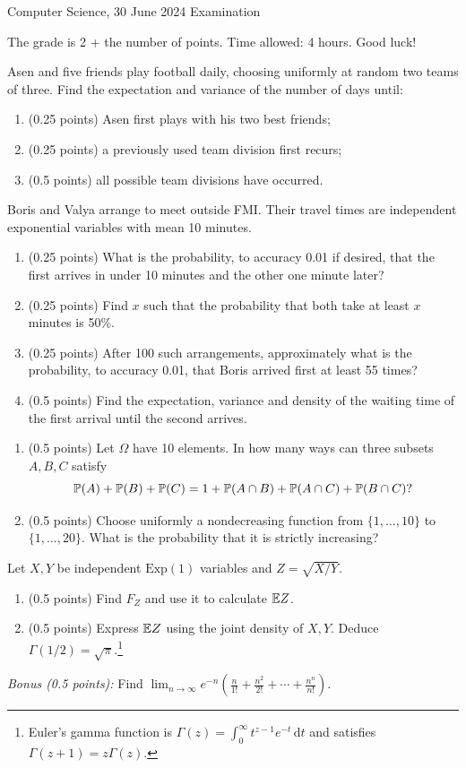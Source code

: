 \documentclass[a4paper]{report}
\begin{document}
\noindent Computer Science, 30 June 2024 \hfill Examination
\hrulefill
\begin{it}The grade is 2 + the number of points. Time allowed: 4 hours. Good luck!\end{it}
\begin{problem}
Asen and five friends play football daily, choosing uniformly at random two teams of three. Find the expectation and variance of the number of days until:
\begin{enumerate}
\item (0.25 points) Asen first plays with his two best friends;
\item (0.25 points) a previously used team division first recurs;
\item (0.5 points) all possible team divisions have occurred.
\end{enumerate}
\end{problem}
\begin{problem}
Boris and Valya arrange to meet outside FMI. Their travel times are independent exponential variables with mean 10 minutes.
\begin{enumerate}
\item (0.25 points) What is the probability, to accuracy 0.01 if desired, that the first arrives in under 10 minutes and the other one minute later?
\item (0.25 points) Find $x$ such that the probability that both take at least $x$ minutes is 50\%.
\item (0.25 points) After 100 such arrangements, approximately what is the probability, to accuracy 0.01, that Boris arrived first at least 55 times?
\item (0.5 points) Find the expectation, variance and density of the waiting time of the first arrival until the second arrives.
\end{enumerate}
\end{problem}
\begin{problem}
\begin{enumerate}
\item (0.5 points) Let $\Omega$ have 10 elements. In how many ways can three subsets $A,B,C$ satisfy
\[\P(A)+\P(B)+\P(C)=1+\P(A\cap B)+\P(A\cap C)+\P(B\cap C)?\]
\item (0.5 points) Choose uniformly a nondecreasing function from $\{1,\ldots,10\}$ to $\{1,\ldots,20\}$. What is the probability that it is strictly increasing?
\end{enumerate}
\end{problem}
\begin{problem}
Let $X,Y$ be independent $\mathrm{Exp}(1)$ variables and $Z=\sqrt{X/Y}$.
\begin{enumerate}
\item (0.5 points) Find $F_Z$ and use it to calculate $\E Z$.
\item (0.5 points) Express $\E Z$ using the joint density of $X,Y$. Deduce $\Gamma(1/2)=\sqrt\pi$.\footnote{Euler's gamma function is $\Gamma(z)=\int_0^\infty t^{z-1}e^{-t}\,\mathrm dt$ and satisfies $\Gamma(z+1)=z\Gamma(z)$.}
\end{enumerate}
\end{problem}
\hrulefill
\emph{Bonus (0.5 points):} Find $\displaystyle\lim_{n\to\infty}e^{-n}\left(\frac n{1!}+\frac{n^2}{2!}+\cdots+\frac{n^n}{n!}\right)$.
\end{document}
